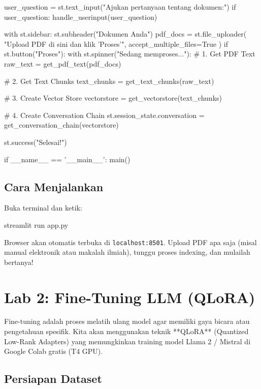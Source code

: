 \begin{codeblock}[language=Python]
    user_question = st.text_input("Ajukan pertanyaan tentang dokumen:")
    if user_question:
        handle_userinput(user_question)

    with st.sidebar:
        st.subheader("Dokumen Anda")
        pdf_docs = st.file_uploader(
            "Upload PDF di sini dan klik 'Proses'",
            accept_multiple_files=True
        )
        if st.button("Proses"):
            with st.spinner("Sedang memproses..."):
                # 1. Get PDF Text
                raw_text = get_pdf_text(pdf_docs)

                # 2. Get Text Chunks
                text_chunks = get_text_chunks(raw_text)

                # 3. Create Vector Store
                vectorstore = get_vectorstore(text_chunks)

                # 4. Create Conversation Chain
                st.session_state.conversation = get_conversation_chain(vectorstore)

                st.success("Selesai!")

if __name__ == '__main__':
    main()
\end{codeblock}

\section{Cara Menjalankan}

Buka terminal dan ketik:
\begin{codeblock}
streamlit run app.py
\end{codeblock}

Browser akan otomatis terbuka di \texttt{localhost:8501}. Upload PDF apa saja (misal manual elektronik atau makalah ilmiah), tunggu proses indexing, dan mulailah bertanya!

\chapter{Lab 2: Fine-Tuning LLM (QLoRA)}
\label{chap:lab2}

Fine-tuning adalah proses melatih ulang model agar memiliki gaya bicara atau pengetahuan spesifik. Kita akan menggunakan teknik **QLoRA** (Quantized Low-Rank Adapters) yang memungkinkan training model Llama 2 / Mistral di Google Colab gratis (T4 GPU).

\section{Persiapan Dataset}

